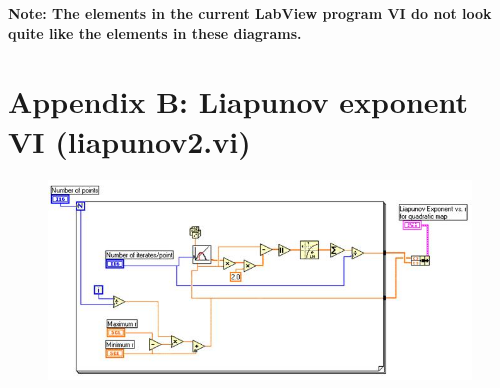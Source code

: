 \documentclass{../lab}
\begin{document}
\textbf{Note: The elements in the current LabView program VI do not look quite like the elements in these diagrams.}

\section{Appendix B: Liapunov exponent VI (liapunov2.vi)}


\begin{figure}[h]
    \centering
    \href{http://experimentationlab.berkeley.edu/sites/default/files/images/Nldimage142.jpg}{\includegraphics[width=0.5\linewidth]{images/Nldimage142.jpg}}
    \caption{}
    \label{fig:Nldimage142}
\end{figure}
\end{document}
